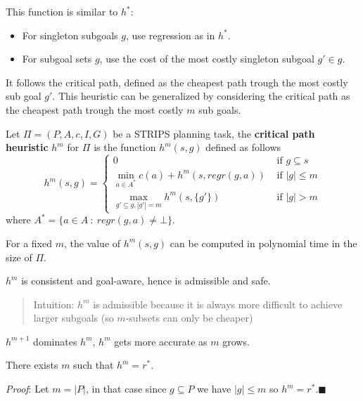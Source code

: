 \documentclass[10pt, letterpaper]{report}
\begin{document}
This function is similar to $h^*$:\begin{itemize}
    \item For singleton subgoals $g$, use regression as in $h^*$. 
    \item For subgoal sets $g$,
 use the cost of the most costly singleton subgoal $g'\in g$.
 \end{itemize}
 It follows the critical path, defined as the cheapest path trough the most costly sub goal $g'$. This heuristic can be generalized by considering the critical path as the cheapest path trough the most costly $m$ sub goals.
 \begin{definition}
    Let $\Pi=(P,A,c,I,G)$ be a STRIPS planning task, the \textbf{critical path heuristic} $h^m$ for $\Pi$ is the function $h^m(s,g)$ defined as follows \begin{equation}
        h^m(s,g)=\begin{cases}
            0&\text{ if }g\subseteq s \\ 
            \displaystyle \min_{a\in A^*}c(a)+h^m(s,regr(g,a)) &\text{ if }|g|\le m \\
            \displaystyle \max_{g'\subseteq g, |g'|=m} h^m(s,\{g'\})&\text{ if }|g|>m 
        \end{cases}
    \end{equation}
     where $A^*=\{a\in A \ : \ regr(g,a)\ne \bot\}$.
\end{definition}
For a fixed $m$, the value of $h^m(s,g)$ can be computed in polynomial time in the size of $\Pi$.
\begin{proposition}
    $h^m$ is consistent and goal-aware, hence is admissible and safe.
\end{proposition}
\begin{quote}
    Intuition: $h^m$ is admissible because it is always more difficult to achieve
 larger subgoals (so $m$-subsets can only be cheaper)
\end{quote}
\begin{proposition}
    $h^{m+1}$ dominates $h^m$, $h^m$ gets more accurate as $m$ grows.
\end{proposition}
\begin{proposition}
    There exists $m$ such that $h^m=r^*$.
\end{proposition}
\textit{Proof}: Let $m=|P|$, in that case since $g\subseteq P$ we have $|g|\le m$ so $h^m=r^*$.\hfill$\blacksquare$
\end{document}
